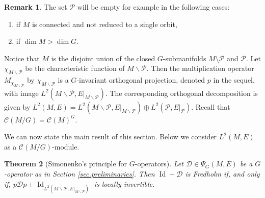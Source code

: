 \documentclass[11pt,a4paper]{amsart}
\newcommand{\maC}{\mathcal C}
\newcommand{\maD}{\mathcal D}
\newcommand{\maK}{\mathcal K}
\newcommand{\maP}{\mathcal P}
\newcommand\<{\langle}
\renewcommand\>{\rangle}
\newcommand{\oid}{\operatorname{Id}}
\newtheorem{theorem}{Theorem}[section]
\theoremstyle{definition}
\newtheorem{remark}[theorem]{Remark}
\begin{document}
\begin{remark} The set $\maP$ will be empty for example in the following cases:
\begin{enumerate}\renewcommand\labelenumi{\rm (\alph{enumi})}
\item if $M$ is connected and not reduced to a single orbit,
\item if $\dim M > \dim G$.
\end{enumerate}
\end{remark}
%


Notice that $M$ is the disjoint union of the closed $G$-submanifolds $M\setminus \maP$ and $\maP$. 
Let $\chi_{M\smallsetminus \maP}$ be the characteristic function of $M\smallsetminus \maP$. 
Then the multiplication operator $M_{\chi_{M\smallsetminus \maP}}$ 
by $\chi_{M\smallsetminus \maP}$ is a $G$-invariant orthogonal projection, 
denoted $p$ in the sequel,
with image $L^2(M\smallsetminus \maP , E\vert_{M\smallsetminus \maP})$. 
The corresponding orthogonal decomposition is given by 
$L^2(M,E) =L^2(M\smallsetminus \maP , E\vert_{M\smallsetminus \maP}) \oplus L^2(\maP,E\vert_\maP)$.
Recall that $\maC(M/G)=\maC(M)^G$. 


We can now state the main result of this section. Below we consider $L^2(M,E)$ as a $\maC(M/G)$-module.


\begin{theorem}[Simonenko's principle for $G$-operators] \label{thm.Simonenko.Gop}
Let $\maD \in \Psi_{G}(M,E)$ be a $G$-operator as in Section \ref{sec.preliminaries}.
Then $\oid +\maD$ is Fredholm if, and only if, $p \maD p + \oid_{L^2(M\smallsetminus \maP , E\vert_{M\smallsetminus \maP})}$ is locally invertible.
\end{theorem}
\end{document}
